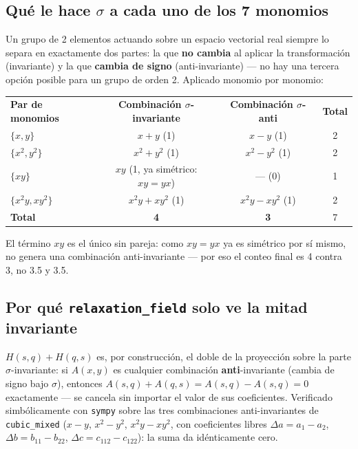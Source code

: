 \documentclass[11pt, a4paper]{article}
\newcommand{\TH}[1]{\cellcolor{cTHbg}\color{white}\textbf{#1}}
\newcommand{\good}[1]{\color{cGood}\textbf{#1}}
\newcommand{\bad}[1]{\color{cBad}\textbf{#1}}
\begin{document}
\subsection{Qu\'e le hace $\sigma$ a cada uno de los 7 monomios}

Un grupo de 2 elementos actuando sobre un espacio vectorial real
siempre lo separa en exactamente dos partes: la que \textbf{no cambia}
al aplicar la transformaci\'on (invariante) y la que \textbf{cambia de
signo} (anti-invariante) --- no hay una tercera opci\'on posible para
un grupo de orden 2. Aplicado monomio por monomio:

\medskip
\begin{center}
\begin{tabular}{lccc}
  \TH{Par de monomios} & \TH{Combinaci\'on $\sigma$-invariante} & \TH{Combinaci\'on $\sigma$-anti} & \TH{Total} \\[1pt]
  $\{x,y\}$       & $x{+}y$ (1)             & $x{-}y$ (1)     & 2 \\
  $\{x^2,y^2\}$   & $x^2{+}y^2$ (1)         & $x^2{-}y^2$ (1) & 2 \\
  $\{xy\}$        & $xy$ (1, ya sim\'etrico: $xy=yx$) & --- (0) & 1 \\
  $\{x^2y,xy^2\}$ & $x^2y{+}xy^2$ (1)       & $x^2y{-}xy^2$ (1) & 2 \\
  \hline
  \TH{Total} & \good{4} & \bad{3} & 7 \\
\end{tabular}
\end{center}
\medskip

El t\'ermino $xy$ es el \'unico sin pareja: como $xy=yx$ ya es
sim\'etrico por s\'i mismo, no genera una combinaci\'on
anti-invariante --- por eso el conteo final es 4 contra 3, no 3.5 y 3.5.

\subsection{Por qu\'e \texttt{relaxation\_field} solo ve la mitad invariante}

$H(s,q)+H(q,s)$ es, por construcci\'on, el doble de la proyecci\'on
sobre la parte $\sigma$-invariante: si $A(x,y)$ es cualquier
combinaci\'on \textbf{anti}-invariante (cambia de signo bajo $\sigma$),
entonces $A(s,q)+A(q,s) = A(s,q)-A(s,q) = 0$ exactamente --- se cancela
sin importar el valor de sus coeficientes. Verificado simb\'olicamente
con \texttt{sympy} sobre las tres combinaciones anti-invariantes de
\texttt{cubic\_mixed} ($x{-}y$, $x^2{-}y^2$, $x^2y{-}xy^2$, con
coeficientes libres $\Delta a=a_1{-}a_2$, $\Delta b=b_{11}{-}b_{22}$,
$\Delta c=c_{112}{-}c_{122}$): la suma da id\'enticamente cero.
\end{document}
